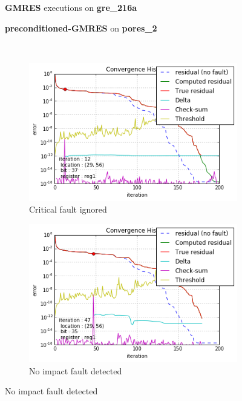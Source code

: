 \begin{figure}[h]
	\centering
    
\begin{minipage}[b]{0.45\linewidth}
\centering
\textbf{GMRES} executions on \textbf{gre_216a} 
\end{minipage}
\quad
\begin{minipage}{0.45\linewidth}
\centering
\textbf{preconditioned-GMRES} on \textbf{pores_2}
\end{minipage}\\


    \begin{minipage}[b]{0.48\linewidth}
	
	\begin{subfigure}[t]{\linewidth}
		\centering
		\includegraphics[width=\linewidth]{figures/gre_216a/convergence_history_threshold_3.png}
		\caption{Critical fault ignored}\label{fig:gre_216a_conv_hist_threshold_3}
	\end{subfigure}
    \quad
    \begin{subfigure}[t]{\linewidth}
		\centering
		\includegraphics[width=\linewidth]{figures/gre_216a/convergence_history_threshold_4.png}
		\caption{No impact fault detected}\label{fig:gre_216a_conv_hist_threshold_4}
	\end{subfigure}
    \end{minipage}
    \quad
    \begin{minipage}[b]{0.48\linewidth}
    	

\end{minipage}
\end{figure}
